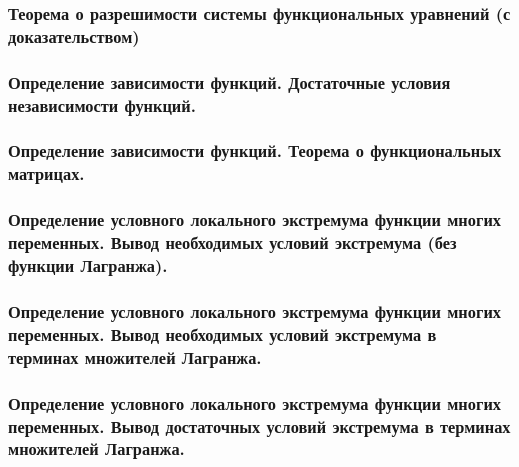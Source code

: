 \documentclass[10pt]{article}
\begin{document}
    \subsubsection{Теорема о разрешимости системы функциональных уравнений (с доказательством)}
    \subsubsection{Определение зависимости функций. Достаточные условия независимости функций.}
    \subsubsection{Определение зависимости функций. Теорема о функциональных матрицах.}
    \subsubsection{Определение условного локального экстремума функции многих переменных. Вывод необходимых условий экстремума (без функции Лагранжа).}
    \subsubsection{Определение условного локального экстремума функции многих переменных. Вывод необходимых условий экстремума в терминах множителей Лагранжа.}
    \subsubsection{Определение условного локального экстремума функции многих переменных. Вывод достаточных условий экстремума в терминах множителей Лагранжа.}
\end{document}
